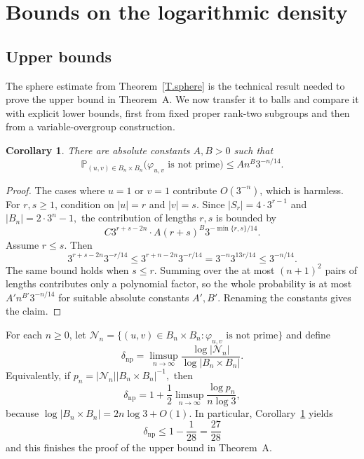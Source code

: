 \documentclass{amsproc}
\newtheorem{corollary}[theorem]{Corollary}
\newcommand{\Prob}{\mathbb P}
\begin{document}
\section{Bounds on the logarithmic density}\label{S.log-density}

\subsection{Upper bounds}

The sphere estimate from Theorem~\ref{T.sphere} is the technical result needed to prove the upper bound in Theorem~A.
We now transfer it to balls and compare it with explicit lower bounds, first
from fixed proper rank-two subgroups and then from a variable-overgroup
construction.

\begin{corollary}\label{C.ball.upper}
There are absolute constants $A,B>0$ such that
\[
        \Prob_{(u,v)\in B_n\times B_n}
        \bigl(\varphi_{u,v}\text{ is not prime}\bigr)
        \leq A n^B3^{-n/14}.
\]
\end{corollary}

\begin{proof}
The cases where $u=1$ or $v=1$ contribute $O(3^{-n})$, which is harmless.
For $r,s\geq 1$, condition on $|u|=r$ and $|v|=s$.  Since
$
        |S_r|=4\cdot 3^{r-1}$ and $
        |B_n|=2\cdot 3^n-1,
$
the contribution of lengths $r,s$ is bounded by
\[
        C 3^{r+s-2n}\cdot A(r+s)^B3^{-\min\{r,s\}/14}.
\]
Assume $r\leq s$.  Then
\[
        3^{r+s-2n}3^{-r/14}
        \leq 3^{r+n-2n}3^{-r/14}
        =3^{-n}3^{13r/14}
        \leq 3^{-n/14}.
\]
The same bound holds when $s\leq r$.  Summing over the at most $(n+1)^2$ pairs
of lengths contributes only a polynomial factor, so the whole probability is at
most $A'n^{B'}3^{-n/14}$ for suitable absolute constants $A',B'$.  Renaming the
constants gives the claim.
\end{proof}

For each $n\geq 0$, let
$
        \mathcal N_n=
        \{(u,v)\in B_n\times B_n:\varphi_{u,v}\text{ is not prime}\}
$
and define
\[
        \delta_{\mathrm{np}}=
        \limsup_{n\to\infty}\frac{\log |\mathcal N_n|}{\log |B_n\times B_n|}.
\]
Equivalently, if
$
        p_n=|\mathcal N_n| |B_n\times B_n|^{-1},
$
then
\[
        \delta_{\mathrm{np}}=
        1+\frac12\limsup_{n\to\infty}\frac{\log p_n}{n\log 3},
\]
because
$
        \log |B_n\times B_n|=2n\log 3+O(1).
$
In particular, Corollary~\ref{C.ball.upper} yields
\[
        \delta_{\mathrm{np}}\leq 1-\frac1{28}=\frac{27}{28}
\]
and this finishes the proof of the upper bound in Theorem~A.
\end{document}
